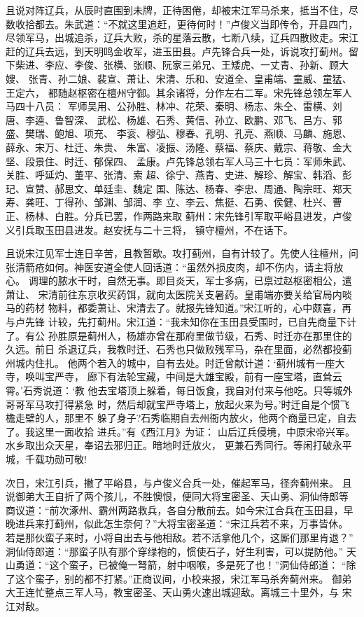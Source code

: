 且说对阵辽兵，从辰时直围到未牌，正待困倦，却被宋江军马杀来，抵当不住，尽
数收拾都去。朱武道：“不就这里追赶，更待何时！”卢俊义当即传令，开县四门，
尽领军马，出城追杀，辽兵大败，杀的星落云散，七断八续，辽兵四散败走。宋江
赶的辽兵去远，到天明鸣金收军，进玉田县。卢先锋合兵一处，诉说攻打蓟州。留
下柴进、李应、李俊、张横、张顺、阮家三弟兄、王矮虎、一丈青、孙新、顾大嫂、
张青、孙二娘、裴宣、萧让、宋清、乐和、安道全、皇甫端、童威、童猛、王定六，
都随赵枢密在檀州守御。其余诸将，分作左右二军。宋先锋总领左军人马四十八员：
军师吴用、公孙胜、林冲、花荣、秦明、杨志、朱仝、雷横、刘唐、李逵、鲁智深、
武松、杨雄、石秀、黄信、孙立、欧鹏、邓飞、吕方、郭盛、樊瑞、鲍旭、项充、
李衮、穆弘、穆春、孔明、孔亮、燕顺、马麟、施恩、薛永、宋万、杜迁、朱贵、
朱富、凌振、汤隆、蔡福、蔡庆、戴宗、蒋敬、金大坚、段景住、时迁、郁保四、
孟康。卢先锋总领右军人马三十七员：军师朱武、关胜、呼延灼、董平、张清、索
超、徐宁、燕青、史进、解珍、解宝、韩滔、彭玘、宣赞、郝思文、单廷圭、魏定
国、陈达、杨春、李忠、周通、陶宗旺、郑天寿、龚旺、丁得孙、邹渊、邹润、李
立、李云、焦挺、石勇、侯健、杜兴、曹正、杨林、白胜。分兵已罢，作两路来取
蓟州：宋先锋引军取平峪县进发，卢俊义引兵取玉田县进发。赵安抚与二十三将，
镇守檀州，不在话下。

且说宋江见军士连日辛苦，且教暂歇。攻打蓟州，自有计较了。先使人往檀州，问
张清箭疮如何。神医安道全使人回话道：“虽然外损皮肉，却不伤内，请主将放心。
调理的脓水干时，自然无事。即目炎天，军士多病，已禀过赵枢密相公，遣萧让、
宋清前往东京收买药饵，就向太医院关支暑药。皇甫端亦要关给官局内啖马的药材
物料，都委萧让、宋清去了。就报先锋知道。”宋江听的，心中颇喜，再与卢先锋
计较，先打蓟州。宋江道：“我未知你在玉田县受围时，已自先商量下计了。有公
孙胜原是蓟州人，杨雄亦曾在那府里做节级，石秀、时迁亦在那里住的久远。前日
杀退辽兵，我教时迁、石秀也只做败残军马，杂在里面，必然都投蓟州城内住扎。
他两个若入的城中，自有去处。时迁曾献计道：‘蓟州城有一座大寺，唤叫宝严寺，
廊下有法轮宝藏，中间是大雄宝殿，前有一座宝塔，直耸云霄。’石秀说道：‘教
他去宝塔顶上躲着，每日饭食，我自对付来与他吃。只等城外哥哥军马攻打得紧急
时，然后却就宝严寺塔上，放起火来为号。’时迁自是个惯飞檐走壁的人，那里不
躲了身子?石秀临期自去州衙内放火，他两个商量已定，自去了。我这里一面收拾
进兵。”有《西江月》为证：
山后辽兵侵境，中原宋帝兴军。水乡取出众天星，奉诏去邪归正。暗地时迁放火，
更兼石秀同行。等闲打破永平城，千载功勋可敬!

次日，宋江引兵，撇了平峪县，与卢俊义合兵一处，催起军马，径奔蓟州来。
且说御弟大王自折了两个孩儿，不胜懊恨，便同大将宝密圣、天山勇、洞仙侍郎等
商议道：“前次涿州、霸州两路救兵，各自分散前去。如今宋江合兵在玉田县，早
晚进兵来打蓟州，似此怎生奈何？”大将宝密圣道：“宋江兵若不来，万事皆休。
若是那伙蛮子来时，小将自出去与他相敌。若不活拿他几个，这厮们那里肯退？”
洞仙侍郎道：“那蛮子队有那个穿绿袍的，惯使石子，好生利害，可以提防他。”
天山勇道：“这个蛮子，已被俺一弩箭，射中咽喉，多是死了也！”洞仙侍郎道：
“除了这个蛮子，别的都不打紧。”正商议间，小校来报，宋江军马杀奔蓟州来。
御弟大王连忙整点三军人马，教宝密圣、天山勇火速出城迎敌。离城三十里外，与
宋江对敌。

